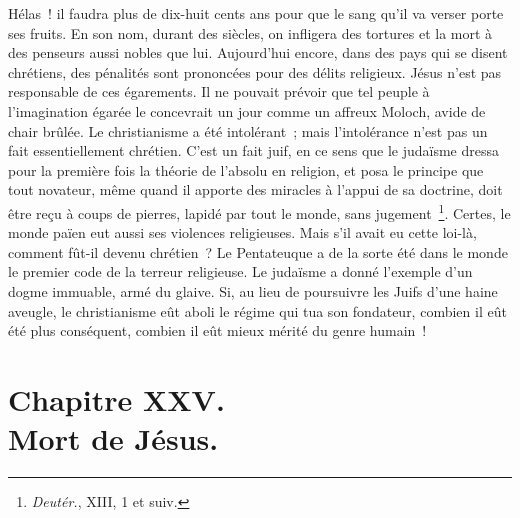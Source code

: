 \documentclass[french,twoside]{book} %
\newcommand\chapteropen{} %
\newcommand\chapterclose{} %
\begin{document}
Hélas ! il faudra plus de dix-huit cents ans pour que le sang qu’il va verser porte ses fruits. En son nom, durant des siècles, on infligera des tortures et la mort à des penseurs aussi nobles que lui. Aujourd’hui encore, dans des pays qui se disent chrétiens, des pénalités sont prononcées pour des délits religieux. Jésus n’est pas responsable de ces égarements. Il ne pouvait prévoir que tel peuple à l’imagination égarée le concevrait un jour comme un affreux Moloch, avide de chair brûlée. Le christianisme a été intolérant ; mais l’intolérance n’est pas un fait essentiellement chrétien. C’est un fait juif, en ce sens que le judaïsme dressa pour la première fois la théorie de l’absolu en religion, et posa le principe que tout novateur, même quand il apporte des miracles à l’appui de sa doctrine, doit être reçu à coups de pierres, lapidé par tout le monde, sans jugement \footnote{{\itshape Deutér.}, XIII, 1 et suiv.}. Certes, le monde païen eut aussi ses violences religieuses. Mais s’il avait eu cette loi-là, comment fût-il devenu chrétien ? Le Pentateuque a de la sorte été dans le monde le premier code de la terreur religieuse. Le judaïsme a donné l’exemple d’un dogme immuable, armé du glaive. Si, au lieu de poursuivre les Juifs d’une haine aveugle, le christianisme eût aboli le régime qui tua son fondateur, combien il eût été plus conséquent, combien il eût mieux mérité du genre humain !
\chapterclose


\chapteropen
\chapter[{Chapitre XXV. Mort de Jésus.}]{Chapitre XXV.\\
Mort de Jésus.}\renewcommand{\leftmark}{Chapitre XXV.\\
Mort de Jésus.}
\end{document}
